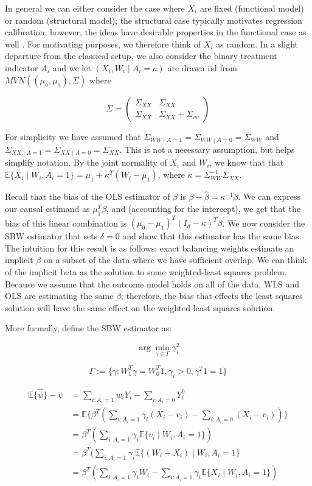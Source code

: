 \documentclass[12pt]{article}
\begin{document}
In general we can either consider the case where $X_i$ are fixed (functional model) or random (structural model); the structural case typically motivates regression calibration, however, the ideas have desirable properties in the functional case as well \cite{gleser1992importance}. For motivating purposes, we therefore think of $X_i$ as random. In a slight departure from the classical setup, we also consider the binary treatment indicator $A_i$ and we let $(X_i, W_i \mid A_i = a)$ are drawn iid from $MVN((\mu_a, \mu_a), \Sigma)$ where 

$$
\Sigma = \begin{pmatrix} 
\Sigma_{XX} & \Sigma_{XX} \\ 
\Sigma_{XX} & \Sigma_{XX} + \Sigma_{vv} 
\end{pmatrix}
$$ 

For simplicity we have assumed that $\Sigma_{WW \mid A = 1} = \Sigma_{WW \mid A = 0} = \Sigma_{WW}$ and $\Sigma_{XX \mid A = 1} = \Sigma_{XX \mid A = 0} = \Sigma_{XX}$. This is not a necessary assumption, but helps simplify notation. By the joint normality of $X_i$ and $W_i$, we know that that $\mathbb{E}\{X_i \mid W_i, A_i = 1\} = \mu_1 + \kappa^T(W_i - \mu_1)$, where $\kappa = \Sigma_{WW}^{-1}\Sigma_{XX}$.

Recall that the bias of the OLS estimator of $\beta$ is $\beta - \hat{\beta} = \kappa^{-1}\beta$. We can express our causal estimand as $\mu_1^T\beta$, and (accounting for the intercept), we get that the bias of this linear combination is $(\mu_0 - \mu_1)^T(I_d - \kappa)^T\beta$. We now consider the SBW estimator that sets $\delta = 0$ and show that this estimator has the same bias. The intuition for this result is as follows: exact balancing weights estimate an implicit $\beta$ on a subset of the data where we have sufficient overlap. We can think of the implicit beta as the solution to some weighted-least squares problem. Because we assume that the outcome model holds on all of the data, WLS and OLS are estimating the same $\beta$; therefore, the bias that effects the least squares solution will have the same effect on the weighted least squares solution.

More formally, define the SBW estimator as:

$$
\arg\min_{\gamma \in \Gamma} \gamma_i^2
$$

$$
\Gamma := \{\gamma: W_1^T\gamma = W_0^T1, \gamma_i > 0, \gamma^T1 = 1\}
$$

\begin{align*}
    \mathbb{E}\{\hat{\psi}\} - \psi &= \sum_{i: A_i = 1}w_iY_i - \sum_{i: A_i = 0}Y_i^0 \\
    &= \mathbb{E}\{\beta^T(\sum_{i: A_i = 1} \gamma_i (X_i - v_i) - \sum_{i: A_i = 0} (X_i - v_i))\} \\
    &= \beta^T(\sum_{i: A_i = 1} \gamma_i\mathbb{E}\{v_i \mid W_i, A_i = 1\}) \\
    &= \beta^T(\sum_{i: A_i = 1} \gamma_i\mathbb{E}\{(W_i - X_i) \mid W_i, A_i = 1\} \\
    &= \beta^T(\sum_{i: A_i = 1} \gamma_iW_i - \sum_{i: A_i = 1} \gamma_i\mathbb{E}\{X_i \mid W_i, A_i = 1\})
\end{align*}
\end{document}
